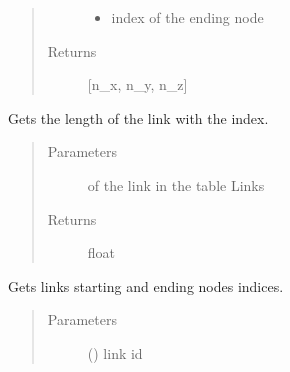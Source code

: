 \documentclass[letterpaper,10pt,english]{sphinxmanual}
\begin{document}
\begin{fulllineitems}
\begin{fulllineitems}
\begin{quote}
\begin{description}
\begin{itemize}
\item {} 
 \textendash{} index of the ending node

\end{itemize}

\item[{Returns}] \leavevmode
{[}n\_x, n\_y, n\_z{]}

\end{description}\end{quote}

\end{fulllineitems}


\begin{fulllineitems}
\label{\detokenize{api:beamon.database.Database.get_link_length}}
Gets the length of the link with the index.
\begin{quote}\begin{description}
\item[{Parameters}] \leavevmode
{} \textendash{} of the link in the table Links

\item[{Returns}] \leavevmode
float

\end{description}\end{quote}

\end{fulllineitems}


\begin{fulllineitems}
\label{\detokenize{api:beamon.database.Database.get_link_nodes}}
Gets links starting and ending nodes indices.
\begin{quote}\begin{description}
\item[{Parameters}] \leavevmode
{} () \textendash{} link id


\end{description}
\end{quote}
\end{fulllineitems}
\end{fulllineitems}
\end{document}
